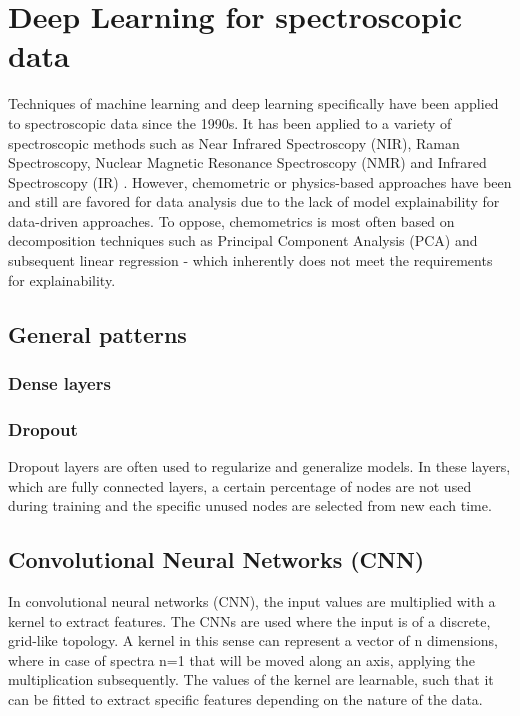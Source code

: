 \label{DL_theory}
\section{Deep Learning for spectroscopic data}

Techniques of machine learning and deep learning specifically have been applied to spectroscopic data since the 1990s. It has been applied to a variety of spectroscopic methods such as Near Infrared Spectroscopy (NIR), Raman Spectroscopy, Nuclear Magnetic Resonance Spectroscopy (NMR) and Infrared Spectroscopy (IR) . However, chemometric or physics-based approaches have been and still are favored for data analysis due to the lack of model explainability for data-driven approaches. To oppose, chemometrics is most often based on decomposition techniques such as Principal Component Analysis (PCA) and subsequent linear regression - which inherently does not meet the requirements for explainability.


\subsection{General patterns}

\subsubsection{Dense layers}
\subsubsection{Dropout}
Dropout layers are often used to regularize and generalize models. In these layers, which are fully connected layers, a certain percentage of nodes are not used during training and the specific unused nodes are selected from new each time.
\subsubsection{}

\subsection{Convolutional Neural Networks (CNN)}

In convolutional neural networks (CNN), the input values are multiplied with a kernel to extract features. The CNNs are used where the input is of a discrete, grid-like topology. A kernel in this sense can represent a vector of n dimensions, where in case of spectra n=1 that will be moved along an axis, applying the multiplication subsequently. The values of the kernel are learnable, such that it can be fitted to extract specific features depending on the nature of the data.

